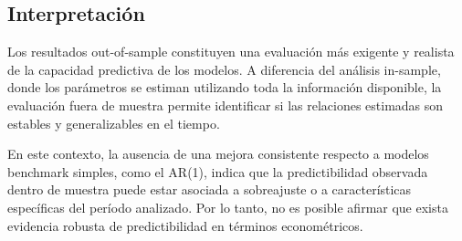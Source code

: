 \documentclass[11pt,a4paper]{article}
\begin{document}
	\subsection{Interpretación}
	Los resultados out-of-sample constituyen una evaluación más exigente y realista de la capacidad predictiva de los modelos. A diferencia del análisis in-sample, donde los parámetros se estiman utilizando toda la información disponible, la evaluación fuera de muestra permite identificar si las relaciones estimadas son estables y generalizables en el tiempo.
	
	En este contexto, la ausencia de una mejora consistente respecto a modelos benchmark simples, como el AR(1), indica que la predictibilidad observada dentro de muestra puede estar asociada a sobreajuste o a características específicas del período analizado. Por lo tanto, no es posible afirmar que exista evidencia robusta de predictibilidad en términos econométricos.
\newpage	
\end{document}
